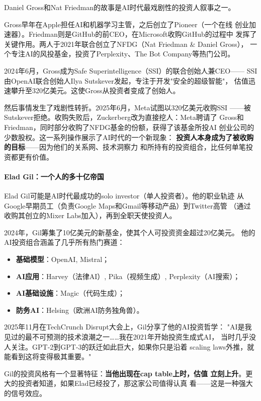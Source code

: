 Daniel Gross和Nat Friedman的故事是AI时代最戏剧性的投资人叙事之一。

Gross早年在Apple担任AI和机器学习主管，之后创立了Pioneer（一个在线
创业加速器）。Friedman则是GitHub的前CEO，在Microsoft收购GitHub的过程中
发挥了关键作用。两人于2021年联合创立了NFDG（Nat Friedman \& Daniel Gross），
一个专注AI的风投基金，投资了Perplexity、The Bot Company等热门公司。

2024年6月，Gross成为Safe Superintelligence（SSI）的联合创始人兼CEO——
SSI由OpenAI联合创始人Ilya Sutskever发起，专注于开发"安全的超级智能"，
估值迅速攀升至320亿美元。这使Gross从投资者变成了创始人。

然后事情发生了戏剧性转折。2025年6月，Meta试图以320亿美元收购SSI
——被Sutskever拒绝。收购失败后，Zuckerberg改为直接挖人：Meta聘请了
Gross和Friedman，同时部分收购了NFDG基金的份额，获得了该基金所投AI
创业公司的少数股权。这一系列操作展示了AI时代的一个新现象：
\textbf{投资人本身成为了被收购的目标}——因为他们的关系网、技术洞察力
和所持有的投资组合，比任何单笔投资都更有价值。

\paragraph{Elad Gil：一个人的多十亿帝国}

Elad Gil可能是AI时代最成功的solo investor（单人投资者）。他的职业轨迹
从Google早期员工（负责Google Maps和Gmail等移动产品）到Twitter高管
（通过收购其创立的Mixer Labs加入），再到全职天使投资人。

2024年，Gil筹集了10亿美元的新基金，使其个人可投资资金超过20亿美元。
他的AI投资组合涵盖了几乎所有热门赛道：
\begin{itemize}
  \item \textbf{基础模型}：OpenAI, Mistral；
  \item \textbf{AI应用}：Harvey（法律AI）, Pika（视频生成）,
    Perplexity（AI搜索）；
  \item \textbf{AI基础设施}：Magic（代码生成）；
  \item \textbf{防务AI}：Helsing（欧洲AI防务独角兽）。
\end{itemize}

2025年11月在TechCrunch Disrupt大会上，Gil分享了他的AI投资哲学：
"AI是我见过的最不可预测的技术浪潮之一……我在2021年开始投资生成式AI，
当时几乎没人关注。GPT-2到GPT-3的跃迁如此巨大，如果你只是沿着
scaling laws外推，就能看到这将变得极其重要。"

Gil的投资风格有一个显著特征：\textbf{当他出现在cap table上时，估值
立刻上升}。更大的投资者知道，如果Elad已经投了，那这家公司值得认真
看——这是一种强大的信号效应。

